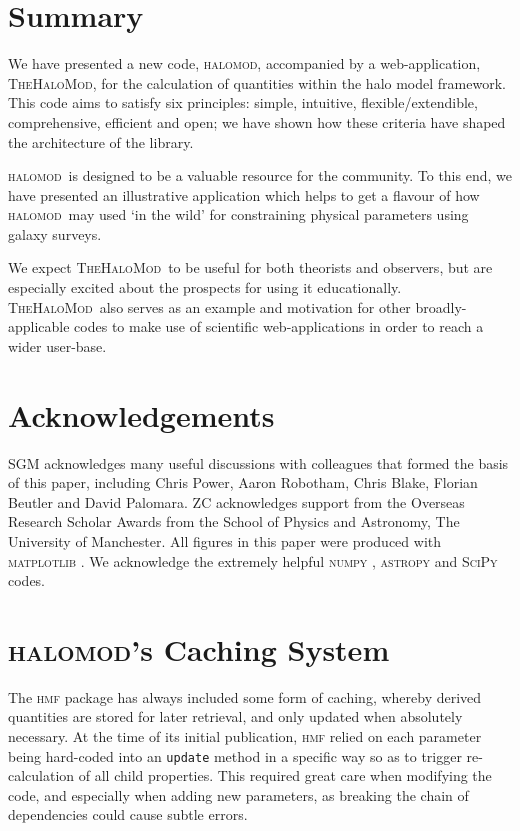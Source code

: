 \documentclass[5p,aas_macros]{elsarticle}
\newcommand{\halomod}{\textsc{halomod}}
\newcommand{\thm}{\textsc{TheHaloMod}}
\begin{document}
\section{Summary}
\label{sec:summary}
We have presented a new code, \halomod, accompanied by a web-application, \thm, for the calculation of quantities within the halo model framework. This code aims to satisfy six principles: simple, intuitive, flexible/extendible, comprehensive, efficient and open; we have shown how these criteria have shaped the architecture of the library.

\halomod\  is designed to be a valuable resource for the community. 
To this end, we have presented an illustrative application which helps to get a flavour of how \halomod\ may used `in the wild' for constraining physical parameters using galaxy surveys.

We expect \thm\ to be useful for both theorists and observers, but are especially excited about the prospects for using it educationally. 
\thm\ also serves as an example and motivation for other broadly-applicable codes to make use of scientific web-applications in order to reach a wider user-base.

\section*{Acknowledgements}
SGM acknowledges many useful discussions with colleagues that formed the basis of this paper, including Chris Power, Aaron Robotham, Chris Blake, Florian Beutler and David Palomara. 
ZC acknowledges support from the Overseas Research Scholar Awards from the School of Physics and Astronomy, The University of Manchester.
All figures in this paper were produced with \textsc{matplotlib} \citep{Hunter2007}. We acknowledge the extremely helpful \textsc{numpy} \citep{vanderWalt2011}, \textsc{astropy} \citep{Robitaille2013,AstropyCollaboration2018} and \textsc{SciPy} \citep{Virtanen2020} codes.




\appendix

\section{\textsc{halomod}'s Caching System}
\label{app:caching}

The \textsc{hmf} package has always included some form of caching, whereby derived quantities are stored for later retrieval, and only updated when absolutely necessary. At the time of its initial publication, \textsc{hmf} relied on each parameter being hard-coded into an \verb|update| method in a specific way so as to trigger re-calculation of all child properties. This required great care when modifying the code, and especially when adding new parameters, as breaking the chain of dependencies could cause subtle errors. 
\end{document}
